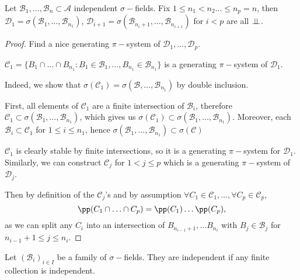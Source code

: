 \documentclass[../main.tex]{subfiles}
\begin{document}
  \begin{application}
    Let $\mathcal{B}_1, \ldots, \mathcal{B}_n \subset \mathcal{A}$ independent $\sigma-$fields.
    Fix $1 \leq n_1 < n_2 \ldots \leq n_p = n$, then $\mathcal{D}_1 = \sigma(\mathcal{B}_1, \ldots,
    \mathcal{B}_{n_1})$, $\mathcal{D}_{i+1} = \sigma(\mathcal{B}_{n_i + 1}, \ldots, \mathcal{B}_{n_{i+1}})$ for $i < p$ are all
    $\perp\!\!\!\!\,\perp$.
  \end{application}
  \begin{proof}
      Find a nice generating $\pi-$system of $\mathcal{D}_1, \ldots, \mathcal{D}_p$.

      \begin{claim}
        $\mathcal{C}_1 = \{ B_1 \cap \ldots \cap B_{n_1} \colon B_1 \in \mathcal{B}_1, \ldots,
        B_{n_1} \in \mathcal{B}_{n_1}\} $ is a generating $\pi-$system of $\mathcal{D}_1$.
      \end{claim}

      Indeed, we show that $\sigma(\mathcal{C}_1) = \sigma(\mathcal{B}, \ldots,
      \mathcal{B}_{n_1})$ by double inclusion.

      First, all elements of $\mathcal{C}_1$ are a finite intersection of $\mathcal{B}_i$,
      therefore $\mathcal{C}_1 \subset \sigma(\mathcal{B}_1, \ldots, \mathcal{B}_{n_1})$, which
      gives us $\sigma(\mathcal{C}_1)\subset \sigma(\mathcal{B}_1, \ldots, \mathcal{B}_{n_1})$. 
      Moreover, each $\mathcal{B}_i \subset \mathcal{C}_1$  for $1 \leq i \leq n_1$, 
      hence $\sigma(\mathcal{B}_1, \ldots, \mathcal{B}_{n_1})\subset\sigma(\mathcal{C})$

      $\mathcal{C}_1$ is clearly stable by finite intersections, so it is a generating $\pi-$system for
      $\mathcal{D}_1$. Similarly, we can construct $\mathcal{C}_j$ for $1 < j \leq p$ which is
      a generating $\pi-$system of $\mathcal{D}_j$.

      Then by definition of the $\mathcal{C}_j$'s and by assumption $\forall C_1 \in
      \mathcal{C}_1,\ldots, \forall C_p \in \mathcal{C}_p$, 
      \[
      \pp(C_1 \cap \ldots \cap C_p) = \pp(C_1)\ldots\pp(C_p)
      ,\] 
      as we can split any $C_i$ into an intersection of $B_{n_{i - 1} + 1}, \ldots B_{n_i}$
      with $B_j \in \mathcal{B}_j$ for $n_{i-1} + 1 \leq j \leq n_{i}$.
  \end{proof}

  \begin{definition}
    Let $(\mathcal{B}_i)_{i \in I}$ be a family of $\sigma-$fields. They are independent if any
    finite collection is independent.
  \end{definition}
\end{document}
